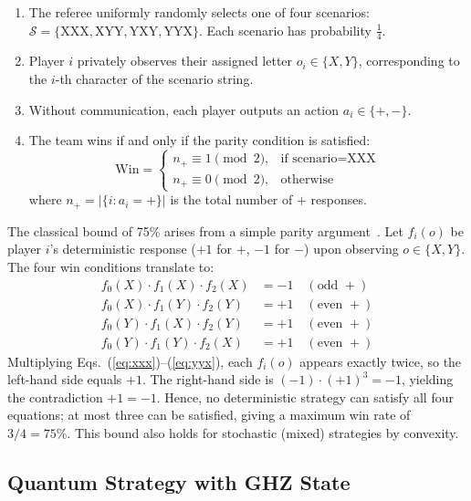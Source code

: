 \documentclass[conference]{IEEEtran}
\begin{document}
\begin{enumerate}
    \item The referee uniformly randomly selects one of four scenarios: $\mathcal{S} = \{\text{XXX}, \text{XYY}, \text{YXY}, \text{YYX}\}$. Each scenario has probability $\frac{1}{4}$.
    \item Player $i$ privately observes their assigned letter $o_i \in \{X, Y\}$, corresponding to the $i$-th character of the scenario string.
    \item Without communication, each player outputs an action $a_i \in \{+, -\}$.
    \item The team wins if and only if the parity condition is satisfied:
    \begin{equation}
        \text{Win} = \begin{cases}
            n_+ \equiv 1 \pmod{2}, & \text{if scenario} = \text{XXX} \\
            n_+ \equiv 0 \pmod{2}, & \text{otherwise}
        \end{cases}
    \end{equation}
    where $n_+ = |\{i : a_i = +\}|$ is the total number of $+$ responses.
\end{enumerate}

The classical bound of 75\% arises from a simple parity argument~\cite{mermin1990}. Let $f_i(o)$ be player $i$'s deterministic response ($+1$ for $+$, $-1$ for $-$) upon observing $o \in \{X, Y\}$. The four win conditions translate to:
\begin{align}
    f_0(X) \cdot f_1(X) \cdot f_2(X) &= -1 \quad (\text{odd } +)\label{eq:xxx}\\
    f_0(X) \cdot f_1(Y) \cdot f_2(Y) &= +1 \quad (\text{even } +)\label{eq:xyy}\\
    f_0(Y) \cdot f_1(X) \cdot f_2(Y) &= +1 \quad (\text{even } +)\label{eq:yxy}\\
    f_0(Y) \cdot f_1(Y) \cdot f_2(X) &= +1 \quad (\text{even } +)\label{eq:yyx}
\end{align}
Multiplying Eqs.~(\ref{eq:xxx})--(\ref{eq:yyx}), each $f_i(o)$ appears exactly twice, so the left-hand side equals $+1$. The right-hand side is $(-1) \cdot (+1)^3 = -1$, yielding the contradiction $+1 = -1$. Hence, no deterministic strategy can satisfy all four equations; at most three can be satisfied, giving a maximum win rate of $3/4 = 75\%$. This bound also holds for stochastic (mixed) strategies by convexity.

\subsection{Quantum Strategy with GHZ State}
\end{document}
